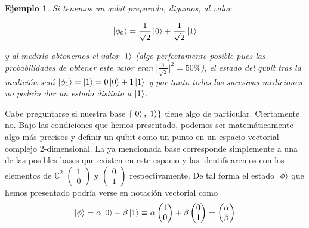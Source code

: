 \documentclass[11pt, spanish]{report}
\numberwithin{equation}{section}
\newtheorem{ejs}[defin]{Ejemplo}
\numberwithin{defin}{section}
\begin{document}

\begin{ejs} Si tenemos un qubit preparado, digamos, al valor 

\begin{equation}
\ket{\phi_0}=\frac{1}{\sqrt{2}}\ket{0}+\frac{1}{\sqrt{2}}\ket{1}
\end{equation}

\noindent y al medirlo obtenemos el valor $\ket{1}$ (algo perfectamente posible pues las probabilidades de obtener este valor eran $\Big|\frac{1}{\sqrt{2}}\Big|^2=50\%$), el estado del qubit tras la medición será $\ket{\phi_1}=\ket{1}=0\ket{0}+1\ket{1}$ y por tanto todas las sucesivas mediciones no podrán dar un estado distinto a $\ket{1}$.\\

\end{ejs}

Cabe preguntarse si nuestra base $\{\ket{0},\ket{1}\}$ tiene algo de particular. Ciertamente no. Bajo las condiciones que hemos presentado, podemos ser matemáticamente algo más precisos y definir un qubit como un punto en un espacio vectorial complejo $2$-dimensional. La ya mencionada base corresponde simplemente a una de las posibles bases que existen en este espacio y las identificaremos con los elementos de $\mathbb{C}^2$ $\begin{pmatrix}1 \\ 0\end{pmatrix}$ y $\begin{pmatrix}0 \\ 1\end{pmatrix}$ respectivamente. De tal forma el estado $\ket{\phi}$ que hemos presentado podría verse en notación vectorial como 
\begin{equation}
\ket{\phi}=\alpha\ket{0}+\beta\ket{1}\equiv\alpha\begin{pmatrix}1 \\ 0\end{pmatrix} + \beta\begin{pmatrix}0 \\ 1\end{pmatrix}=\begin{pmatrix}\alpha \\ \beta \end{pmatrix}
\end{equation}
\end{document}
